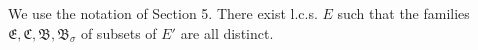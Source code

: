 We use the notation of Section 5. There exist l.c.s. $E$ such that the families $\mathfrak{E}, \mathfrak{C}, \mathfrak{B}, \mathfrak{B}_\sigma$ of subsets of $E'$ are all distinct.
